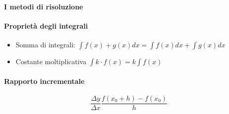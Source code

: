 \documentclass[12pt, a4paper, openany]{article}
\begin{document}
\paragraph*{I metodi di risoluzione}
\paragraph*{Proprietà degli integrali}
\begin{itemize}
	\item Somma di integrali: $\int f(x)+g(x) dx = \int f(x) dx + \int g(x) dx$
	\item Costante moltiplicativa $\int k \cdot f(x) = k \int f(x)$
\end{itemize}

\paragraph*{Rapporto incrementale}
$$\frac{\Delta y}{ \Delta x}\frac{f(x_0+h)-f(x_0)}{h} $$
\end{document}
